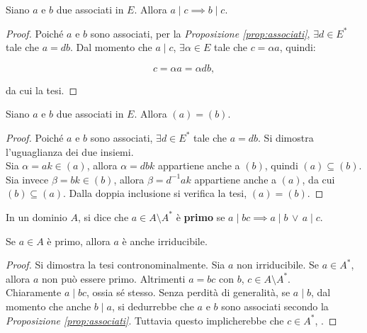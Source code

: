 \begin{proposition}
    \label{prop:divisione_associati}
    Siano $a$ e $b$ due associati in $E$. Allora $a \mid c \implies b \mid c$.
\end{proposition}

\begin{proof}
    Poiché $a$ e $b$ sono associati, per la \textit{Proposizione \ref{prop:associati}}, $\exists d \in E^*$ tale che
    $a = db$. Dal momento che $a \mid c$, $\exists \alpha \in E$ tale che
    $c = \alpha a$, quindi:

    \[ c = \alpha a = \alpha d b,\]

    da cui la tesi.
\end{proof}

\begin{proposition}
    \label{prop:associati_generatori}
    Siano $a$ e $b$ due associati in $E$. Allora
    $(a)=(b)$.
\end{proposition}

\begin{proof}
    Poiché $a$ e $b$ sono associati, $\exists d \in E^*$ tale che $a = db$. Si dimostra l'uguaglianza dei due insiemi. \\

    Sia $\alpha = ak \in (a)$, allora $\alpha = dbk$ appartiene anche a $(b)$, quindi $(a) \subseteq (b)$. Sia
    invece $\beta = bk \in (b)$, allora $\beta = d^{-1}ak$
    appartiene anche a $(a)$, da cui $(b) \subseteq (a)$.
    Dalla doppia inclusione si verifica la tesi, $(a)=(b)$.
\end{proof}

\begin{definition}
    In un dominio $A$, si dice che $a \in A \setminus A^*$ è \textbf{primo} se
    $a \mid bc \implies a \mid b \,\lor\, a \mid c$.
\end{definition}

\begin{proposition}
    Se $a \in A$ è primo, allora $a$ è anche irriducibile.
\end{proposition}

\begin{proof}
    Si dimostra la tesi contronominalmente. Sia $a$ non irriducibile. Se
    $a \in A^*$, allora $a$ non può essere primo. Altrimenti $a=bc$ con
    $b$, $c \in A \setminus A^*$. \\

    Chiaramente $a \mid bc$, ossia sé stesso. Senza perdità di generalità, se $a \mid b$, dal momento che anche $b \mid a$,
    si dedurrebbe che $a$ e $b$ sono associati secondo la
    \textit{Proposizione \ref{prop:associati}}. Tuttavia questo
    implicherebbe che $c \in A^*$, \Lightning{}.
\end{proof}

